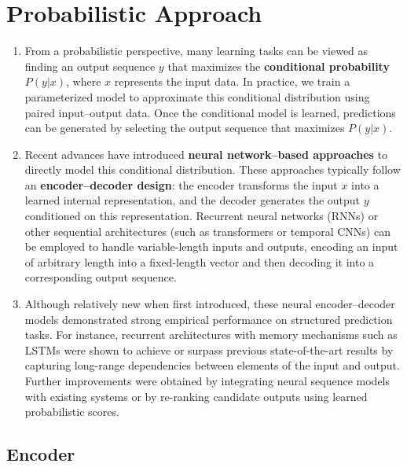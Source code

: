 \section{Probabilistic Approach}

\begin{enumerate}
    \item From a probabilistic perspective, many learning tasks can be viewed as finding an output sequence $y$ that maximizes the \textbf{conditional probability} $P(y|x)$, where $x$ represents the input data.
    In practice, we train a parameterized model to approximate this conditional distribution using paired input–output data. 
    Once the conditional model is learned, predictions can be generated by selecting the output sequence that maximizes $P(y|x)$.
    \hfill \cite{arxiv/1409.0473/NMT-Jointly-Learning-Align-Translate, common/online/chatgpt}

    \item Recent advances have introduced \textbf{neural network–based approaches} to directly model this conditional distribution. 
    These approaches typically follow an \textbf{encoder–decoder design}: the encoder transforms the input $x$ into a learned internal representation, and the decoder generates the output $y$ conditioned on this representation.
    Recurrent neural networks (RNNs) or other sequential architectures (such as transformers or temporal CNNs) can be employed to handle variable-length inputs and outputs, encoding an input of arbitrary length into a fixed-length vector and then decoding it into a corresponding output sequence.
    \hfill \cite{arxiv/1409.0473/NMT-Jointly-Learning-Align-Translate, common/online/chatgpt}

    \item Although relatively new when first introduced, these neural encoder–decoder models demonstrated strong empirical performance on structured prediction tasks.
    For instance, recurrent architectures with memory mechanisms such as LSTMs were shown to achieve or surpass previous state-of-the-art results by capturing long-range dependencies between elements of the input and output.
    Further improvements were obtained by integrating neural sequence models with existing systems or by re-ranking candidate outputs using learned probabilistic scores.
    \hfill \cite{arxiv/1409.0473/NMT-Jointly-Learning-Align-Translate, common/online/chatgpt}
\end{enumerate}


\subsection{Encoder}

